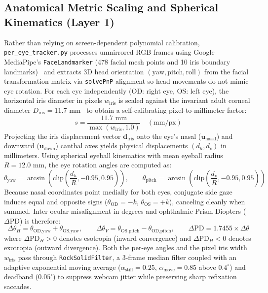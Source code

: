 \documentclass[11pt,a4paper]{article}
\begin{document}
\subsection{Anatomical Metric Scaling and Spherical Kinematics (Layer 1)}
Rather than relying on screen-dependent polynomial calibration, \texttt{per\_eye\_tracker.py} processes unmirrored RGB frames using Google MediaPipe's \texttt{FaceLandmarker} (478 facial mesh points and 10 iris boundary landmarks)~\cite{ref3} and extracts 3D head orientation $(\text{yaw}, \text{pitch}, \text{roll})$ from the facial transformation matrix via \texttt{solvePnP} alignment so head movements do not mimic eye rotation. For each eye independently (OD: right eye, OS: left eye), the horizontal iris diameter in pixels $w_{\text{iris}}$ is scaled against the invariant adult corneal diameter $D_{\text{iris}} = 11.7\text{ mm}$~\cite{ref1} to obtain a self-calibrating pixel-to-millimeter factor:
\begin{equation}
s = \frac{11.7\text{ mm}}{\max(w_{\text{iris}}, 1.0)} \quad (\text{mm/px})
\end{equation}
Projecting the iris displacement vector $\mathbf{d}_{\text{iris}}$ onto the eye's nasal ($\mathbf{u}_{\text{nasal}}$) and downward ($\mathbf{u}_{\text{down}}$) canthal axes yields physical displacements $(d_h, d_v)$ in millimeters. Using spherical eyeball kinematics with mean eyeball radius $R = 12.0\text{ mm}$, the eye rotation angles are computed as:
\begin{equation}
\theta_{\text{yaw}} = \arcsin\!\left(\text{clip}\!\left(\frac{d_h}{R}, -0.95, 0.95\right)\right), \qquad \theta_{\text{pitch}} = \arcsin\!\left(\text{clip}\!\left(\frac{d_v}{R}, -0.95, 0.95\right)\right)
\end{equation}
Because nasal coordinates point medially for both eyes, conjugate side gaze induces equal and opposite signs ($\theta_{\text{OD}} = -k$, $\theta_{\text{OS}} = +k$), canceling cleanly when summed. Inter-ocular misalignment in degrees and ophthalmic Prism Diopters ($\Delta\text{PD}$) is therefore:
\begin{equation}
\Delta\theta_H = \theta_{\text{OD,yaw}} + \theta_{\text{OS,yaw}}, \qquad \Delta\theta_V = \theta_{\text{OS,pitch}} - \theta_{\text{OD,pitch}}, \qquad \Delta\text{PD} = 1.7455 \times \Delta\theta
\end{equation}
where $\Delta\text{PD}_H > 0$ denotes esotropia (inward convergence) and $\Delta\text{PD}_H < 0$ denotes exotropia (outward divergence). Both the per-eye angles and the pixel iris width $w_{\text{iris}}$ pass through \texttt{RockSolidFilter}, a 3-frame median filter coupled with an adaptive exponential moving average ($\alpha_{\text{still}} = 0.25$, $\alpha_{\text{move}} = 0.85$ above $0.4^\circ$) and deadband ($0.05^\circ$) to suppress webcam jitter while preserving sharp refixation saccades.
\end{document}
